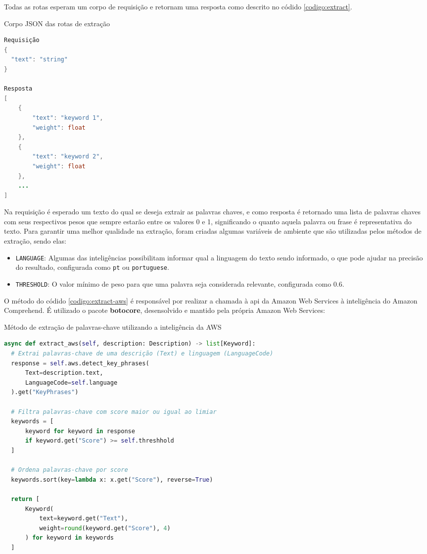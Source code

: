 Todas as rotas esperam um corpo de requisição e retornam uma resposta como descrito no códido \ref{codigo:extract}.

\begin{sourcecode}[H]
  \caption{\label{codigo:extract}Corpo JSON das rotas de extração}
  \begin{lstlisting}[frame=single, language=Java]
Requisição
{
  "text": "string"
}

Resposta
[
	{
		"text": "keyword 1",
		"weight": float
	},
	{
		"text": "keyword 2",
		"weight": float
	},
	...
]
\end{lstlisting}
  \fonte{}
\end{sourcecode}

Na requisição é esperado um texto do qual se deseja extrair as palavras chaves, e como resposta é retornado uma lista de palavras chaves com seus respectivos pesos que sempre estarão entre os valores 0 e 1, significando o quanto aquela palavra ou frase é representativa do texto. Para garantir uma melhor qualidade na extração, foram criadas algumas variáveis de ambiente que são utilizadas pelos métodos de extração, sendo elas:

\begin{itemize}
  \item \texttt{LANGUAGE}: Algumas das inteligências possibilitam informar qual a linguagem do texto sendo informado, o que pode ajudar na precisão do resultado, configurada como \texttt{pt} ou \texttt{portuguese}.
  \item \texttt{THRESHOLD}: O valor mínimo de peso para que uma palavra seja considerada relevante, configurada como 0.6.
\end{itemize}

O método do códido \ref{codigo:extract-aws} é responsável por realizar a chamada à \gls{api} da Amazon Web Services à inteligência do Amazon Comprehend. É utilizado o pacote \textbf{botocore}, desensolvido e mantido pela própria Amazon Web Services:

\begin{sourcecode}[H]
  \caption{\label{codigo:extract-aws}Método de extração de palavras-chave utilizando a inteligência da AWS}
  \begin{lstlisting}[frame=single, language=Python]
async def extract_aws(self, description: Description) -> list[Keyword]:
  # Extrai palavras-chave de uma descrição (Text) e linguagem (LanguageCode)
  response = self.aws.detect_key_phrases(
      Text=description.text, 
      LanguageCode=self.language
  ).get("KeyPhrases")

  # Filtra palavras-chave com score maior ou igual ao limiar
  keywords = [
      keyword for keyword in response 
      if keyword.get("Score") >= self.threshhold
  ]

  # Ordena palavras-chave por score
  keywords.sort(key=lambda x: x.get("Score"), reverse=True)

  return [
      Keyword(
          text=keyword.get("Text"), 
          weight=round(keyword.get("Score"), 4)
      ) for keyword in keywords
  ]
\end{lstlisting}
  \fonte{}
\end{sourcecode}

